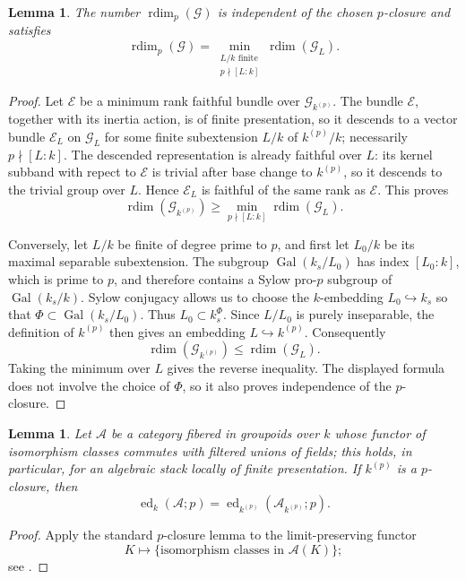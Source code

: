 \documentclass[11pt,reqno]{amsart}
\numberwithin{equation}{section}
\theoremstyle{plain}
\newtheorem{lemm}[prop]{Lemma}
\theoremstyle{definition}
\def\cA{{\mathcal A}}
\def\cG{{\mathcal G}}
\def\cE{{\mathcal E}}
\def\rdim{{\operatorname{rdim}}}
\def\ed{{\operatorname{ed}}}
\begin{document}
\begin{lemm}\label{lem:p-local-rdim}
The number $\rdim_p(\cG)$ is independent of the chosen $p$-closure
and satisfies
\[
\rdim_p(\cG)=
\min_{\substack{L/k\text{ finite}\\p\nmid[L:k]}}
\rdim(\cG_L).
\]
\end{lemm}

\begin{proof}
Let $\cE$ be a minimum rank faithful bundle over $\cG_{k^{(p)}}$. The bundle $\cE$, together with its inertia action, is of finite
presentation, so it descends to a vector bundle $\cE_L$ on $\cG_L$
for some finite subextension $L/k$ of $k^{(p)}/k$; necessarily
$p\nmid[L:k]$.  The descended representation is already faithful over
$L$: its kernel subband with repect to $\cE$ is trivial after base change to $k^{(p)}$, so it descends to the trivial group over $L$. Hence $\cE_L$ is faithful of the same rank as $\cE$.  This proves
\[
\rdim(\cG_{k^{(p)}})\ge
\min_{p\nmid[L:k]}\rdim(\cG_L).
\]

Conversely, let $L/k$ be finite of degree prime to $p$, and first
let $L_0/k$ be its maximal separable subextension.  The subgroup
$\operatorname{Gal}(k_s/L_0)$ has index $[L_0:k]$, which is prime to $p$, and
therefore contains a Sylow pro-$p$ subgroup of
$\operatorname{Gal}(k_s/k)$.
Sylow conjugacy allows us to choose the $k$-embedding
$L_0\hookrightarrow k_s$ so that
$\Phi\subset\operatorname{Gal}(k_s/L_0)$.  Thus
$L_0\subset k_s^\Phi$.  Since
$L/L_0$ is purely inseparable, the definition of $k^{(p)}$ then gives
an embedding $L\hookrightarrow k^{(p)}$.  Consequently
\[
\rdim(\cG_{k^{(p)}})\le\rdim(\cG_L).
\]
Taking the minimum over $L$ gives the reverse inequality.  The displayed
formula does not involve the choice of $\Phi$, so it also proves
independence of the $p$-closure.
\end{proof}

\begin{lemm}\label{lem:p-special-ed-invariance}
Let $\cA$ be a category fibered in groupoids over $k$ whose functor of
isomorphism classes commutes with filtered unions of fields; this holds, in
particular, for an algebraic stack locally of finite presentation.  If
$k^{(p)}$ is a $p$-closure, then
\[
\ed_k(\cA;p)=
\ed_{k^{(p)}}(\cA_{k^{(p)}};p).
\]
\end{lemm}

\begin{proof}
Apply the standard $p$-closure lemma to the limit-preserving functor
\[
K\longmapsto\{\text{isomorphism classes in }\cA(K)\};
\]
see \cite[Lemma~2.3(b)]{LMMR13}.
\end{proof}
\end{document}
